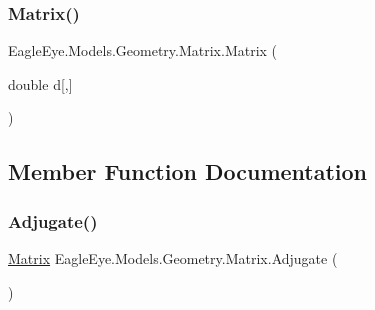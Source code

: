 \subsubsection{\texorpdfstring{Matrix()}{Matrix()}\hspace{0.1cm}{\footnotesize\ttfamily [3/3]}}
{\footnotesize\ttfamily Eagle\+Eye.\+Models.\+Geometry.\+Matrix.\+Matrix (\begin{DoxyParamCaption}\item[{double}]{d\mbox{[},\mbox{]} }\end{DoxyParamCaption})}



\subsection{Member Function Documentation}
\mbox{\label{class_eagle_eye_1_1_models_1_1_geometry_1_1_matrix_a50a22a69e3975db229558520997b91a2}} 
\subsubsection{\texorpdfstring{Adjugate()}{Adjugate()}}
{\footnotesize\ttfamily \mbox{\hyperlink{class_eagle_eye_1_1_models_1_1_geometry_1_1_matrix}{Matrix}} Eagle\+Eye.\+Models.\+Geometry.\+Matrix.\+Adjugate (\begin{DoxyParamCaption}{ }\end{DoxyParamCaption})}

